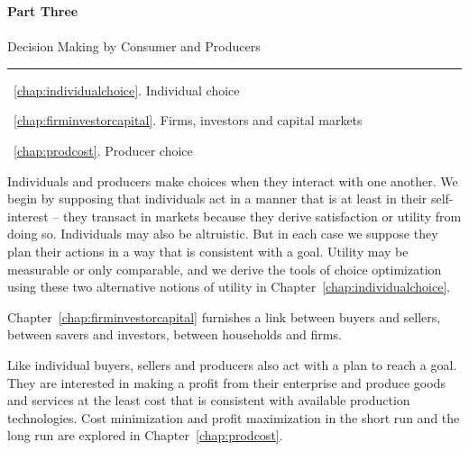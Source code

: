 \cleardoublepage
\thispagestyle{empty}
\vspace{30mm}
{\color{parttextcolour}\fontsize{1.25cm}{3em}\selectfont\textbf{Part Three}} \\ \\
{\color{parttextcolour}\huge Decision Making by Consumer and Producers}

\vspace{10mm}
{\color{partlinecolour}\rule{25em}{2pt}}
\vspace{10mm}

{\large\color{parttextcolour}
~\ref{chap:individualchoice}. Individual choice

~\ref{chap:firminvestorcapital}. Firms, investors and capital markets

~\ref{chap:prodcost}. Producer choice}

\vspace{10mm}

{\normalfont Individuals and producers make choices when they interact with one another. We begin by supposing that individuals act in a manner that is at least in their self-interest -- they transact in markets because they derive satisfaction or utility from doing so. Individuals may also be altruistic. But in each case we suppose they plan their actions in a way that is consistent with a goal. Utility may be measurable or only comparable, and we derive the tools of choice optimization using these two alternative notions of utility in Chapter~\ref{chap:individualchoice}.

Chapter~\ref{chap:firminvestorcapital} furnishes a link between buyers and sellers, between savers and investors, between households and firms.

Like individual buyers, sellers and producers also act with a plan to reach a goal. They are interested in making a profit from their enterprise and produce goods and services at the least cost that is consistent with available production technologies. Cost minimization and profit maximization in the short run and the long run are explored in Chapter~\ref{chap:prodcost}.}

